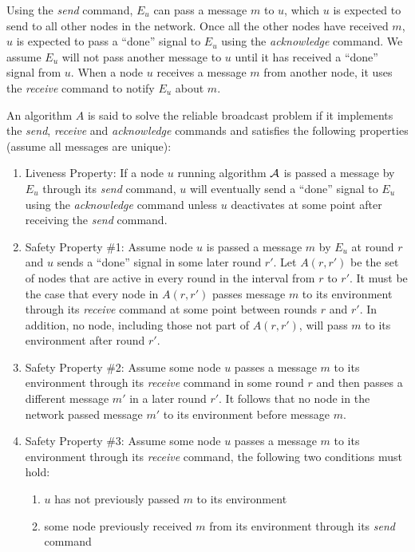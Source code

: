 \documentclass[english]{article}
\begin{document}
Using the \textit{send} command, $E_u$ can pass a message $m$ to $u$, which $u$ is expected to send to all other nodes in the network. Once all the other nodes have received $m$, $u$ is expected to pass a ``done'' signal to $E_u$ using the \textit{acknowledge} command. We assume $E_u$ will not pass another message to $u$ until it has received a ``done'' signal from $u$. 
When a node $u$ receives a message $m$ from another node, it uses the \textit{receive} command to notify $E_u$ about $m$.

An algorithm $A$ is said to solve the reliable broadcast problem if it implements the \textit{send}, \textit{receive} and \textit{acknowledge} commands and satisfies the following properties (assume all messages are unique):

\begin {enumerate}
 
  \item Liveness Property: If a node $u$ running algorithm $\cal A$ is passed a message by $E_u$ through its \textit{send} command, $u$ will eventually send  a ``done'' signal to $E_u$ using the \textit{acknowledge} command unless $u$ deactivates at some point after receiving the \textit{send} command.

  \item Safety Property \#1: Assume node $u$ is passed a message $m$ by $E_u$ at round $r$ and $u$ sends  a ``done'' signal in some later round $r'$. Let $A(r,r')$ be the set of nodes that are active in every round in the interval from $r$ to $r'$. It must be the case that every node in $A(r,r')$ passes message $m$ to its environment through its \textit{receive} command at some point between rounds $r$ and $r'$. In addition, no node, including those not part of $A(r,r')$, will pass $m$ to its environment after round $r'$. 

  \item Safety Property \#2: Assume some node $u$ passes a message $m$ to its environment through its \textit{receive} command in some round $r$ and then passes a different message $m'$ in a later round $r'$. It follows that no node in the network passed message $m'$ to its environment before message $m$. 

  \item Safety Property \#3: Assume some node $u$ passes a message $m$ to its environment through its \textit{receive} command, the following two conditions must hold:
  \begin {enumerate}
    \item $u$ has not previously passed $m$ to its environment
    \item some node previously received $m$ from its environment through its \textit{send} command
  \end{enumerate}

\end{enumerate}
\end{document}
